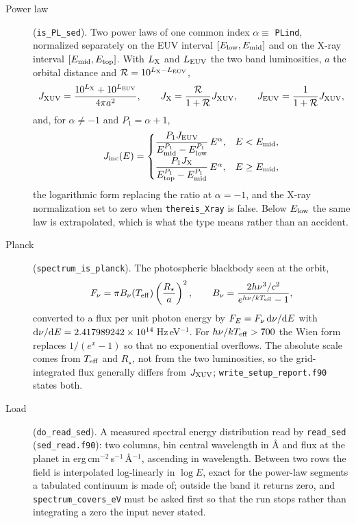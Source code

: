 \begin{description}
\item[Power law] (\texttt{is\_PL\_sed}). Two power laws of one common index
  $\alpha \equiv$ \texttt{PLind}, normalized separately on the EUV interval
  $[E_{\rm low},E_{\rm mid}]$ and on the X-ray interval
  $[E_{\rm mid},E_{\rm top}]$. With
  $L_{\rm X}$ and $L_{\rm EUV}$ the two band luminosities, $a$ the orbital
  distance and $\mathcal{R} = 10^{L_{\rm X}-L_{\rm EUV}}$,
  \begin{equation}
  J_{\rm XUV} = \frac{10^{L_{\rm X}} + 10^{L_{\rm EUV}}}{4\pi a^{2}},
  \qquad
  J_{\rm X} = \frac{\mathcal{R}}{1+\mathcal{R}}J_{\rm XUV},
  \qquad
  J_{\rm EUV} = \frac{1}{1+\mathcal{R}}J_{\rm XUV},
  \label{eq:rad:bandsplit}
  \end{equation}
  and, for $\alpha \neq -1$ and $P_1 = \alpha+1$,
  \begin{equation}
  J_{\rm inc}(E) =
  \begin{cases}
    \dfrac{P_1 J_{\rm EUV}}{E_{\rm mid}^{P_1}-E_{\rm low}^{P_1}}\,E^{\alpha},
      & E < E_{\rm mid},\\[2ex]
    \dfrac{P_1 J_{\rm X}}{E_{\rm top}^{P_1}-E_{\rm mid}^{P_1}}\,E^{\alpha},
      & E \ge E_{\rm mid},
  \end{cases}
  \label{eq:rad:powerlaw}
  \end{equation}
  the logarithmic form replacing the ratio at $\alpha=-1$, and the X-ray
  normalization set to zero when \texttt{thereis\_Xray} is false. Below
  $E_{\rm low}$ the same law is extrapolated, which is what the type means
  rather than an accident.
\item[Planck] (\texttt{spectrum\_is\_planck}). The photospheric blackbody
  seen at the orbit,
  \begin{equation}
  F_\nu = \pi B_\nu(T_{\rm eff})\left(\frac{R_\star}{a}\right)^{2},
  \qquad
  B_\nu = \frac{2h\nu^{3}/c^{2}}{e^{h\nu/kT_{\rm eff}}-1},
  \label{eq:rad:planck}
  \end{equation}
  converted to a flux per unit photon energy by $F_E = F_\nu\,{\rm d}\nu/{\rm d}E$
  with ${\rm d}\nu/{\rm d}E = 2.417989242\times 10^{14}$\,Hz\,eV$^{-1}$.
  For $h\nu/kT_{\rm eff} > 700$ the Wien form replaces $1/(e^{x}-1)$ so that
  no exponential overflows. The absolute scale comes from $T_{\rm eff}$ and
  $R_\star$, not from the two luminosities, so the grid-integrated flux
  generally differs from $J_{\rm XUV}$; \texttt{write\_setup\_report.f90}
  states both.
\item[Load] (\texttt{do\_read\_sed}). A measured spectral energy
  distribution read by \texttt{read\_sed} (\texttt{sed\_read.f90}): two
  columns, bin central wavelength in \AA{} and flux at the planet in
  erg\,cm$^{-2}$\,s$^{-1}$\,\AA$^{-1}$, ascending in wavelength. Between
  two rows the field is interpolated log-linearly in $\log E$, exact for the
  power-law segments a tabulated continuum is made of; outside the band it
  returns zero, and \texttt{spectrum\_covers\_eV} must be asked first so
  that the run stops rather than integrating a zero the input never stated.
\end{description}

